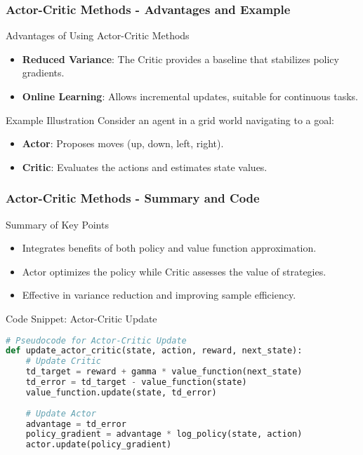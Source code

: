 \documentclass[aspectratio=169]{beamer}
\begin{document}
\begin{frame}[fragile]
    \frametitle{Actor-Critic Methods - Advantages and Example}
    \begin{block}{Advantages of Using Actor-Critic Methods}
        \begin{itemize}
            \item \textbf{Reduced Variance}: The Critic provides a baseline that stabilizes policy gradients.
            \item \textbf{Online Learning}: Allows incremental updates, suitable for continuous tasks.
        \end{itemize}
    \end{block}

    \begin{block}{Example Illustration}
        Consider an agent in a grid world navigating to a goal:
        \begin{itemize}
            \item \textbf{Actor}: Proposes moves (up, down, left, right).
            \item \textbf{Critic}: Evaluates the actions and estimates state values.
        \end{itemize}
    \end{block}
\end{frame}

\begin{frame}[fragile]
    \frametitle{Actor-Critic Methods - Summary and Code}
    \begin{block}{Summary of Key Points}
        \begin{itemize}
            \item Integrates benefits of both policy and value function approximation.
            \item Actor optimizes the policy while Critic assesses the value of strategies.
            \item Effective in variance reduction and improving sample efficiency.
        \end{itemize}
    \end{block}

    \begin{block}{Code Snippet: Actor-Critic Update}
    \begin{lstlisting}[language=Python]
# Pseudocode for Actor-Critic Update
def update_actor_critic(state, action, reward, next_state):
    # Update Critic
    td_target = reward + gamma * value_function(next_state)
    td_error = td_target - value_function(state)
    value_function.update(state, td_error)
    
    # Update Actor
    advantage = td_error
    policy_gradient = advantage * log_policy(state, action)
    actor.update(policy_gradient)
    \end{lstlisting}
    \end{block}
\end{frame}
\end{document}
